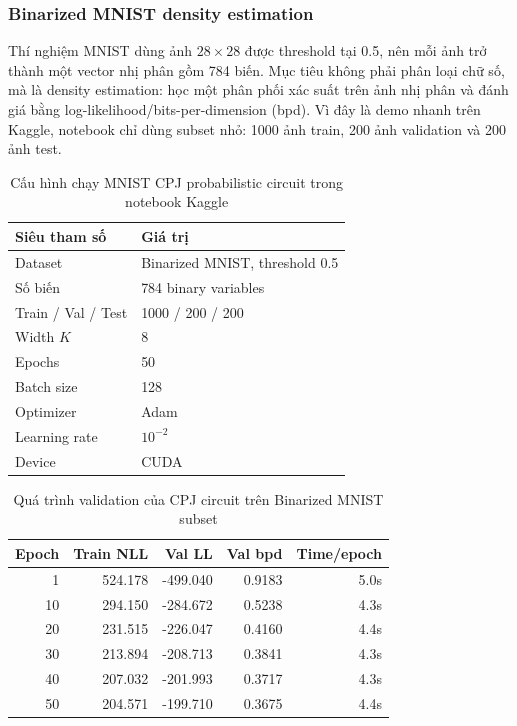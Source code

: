 \subsubsection{Binarized MNIST density estimation}

Thí nghiệm MNIST dùng ảnh $28\times 28$ được threshold tại 0.5, nên mỗi ảnh trở
thành một vector nhị phân gồm 784 biến. Mục tiêu không phải phân loại chữ số, mà
là density estimation: học một phân phối xác suất trên ảnh nhị phân và đánh giá
bằng log-likelihood/bits-per-dimension (bpd). Vì đây là demo nhanh trên Kaggle,
notebook chỉ dùng subset nhỏ: 1000 ảnh train, 200 ảnh validation và 200 ảnh test.

\begin{table}[H]
\centering
\caption{Cấu hình chạy MNIST CPJ probabilistic circuit trong notebook Kaggle}
\label{tab:pc-mnist-config}
\renewcommand{\arraystretch}{1.2}
\begin{tabular}{ll}
\toprule
\textbf{Siêu tham số} & \textbf{Giá trị} \\
\midrule
Dataset & Binarized MNIST, threshold 0.5 \\
Số biến & 784 binary variables \\
Train / Val / Test & 1000 / 200 / 200 \\
Width $K$ & 8 \\
Epochs & 50 \\
Batch size & 128 \\
Optimizer & Adam \\
Learning rate & $10^{-2}$ \\
Device & CUDA \\
\bottomrule
\end{tabular}
\end{table}

\begin{table}[H]
\centering
\caption{Quá trình validation của CPJ circuit trên Binarized MNIST subset}
\label{tab:pc-mnist-val}
\renewcommand{\arraystretch}{1.2}
\begin{tabular}{rrrrr}
\toprule
\textbf{Epoch} & \textbf{Train NLL} & \textbf{Val LL} & \textbf{Val bpd} & \textbf{Time/epoch} \\
\midrule
1  & 524.178 & -499.040 & 0.9183 & 5.0s \\
10 & 294.150 & -284.672 & 0.5238 & 4.3s \\
20 & 231.515 & -226.047 & 0.4160 & 4.4s \\
30 & 213.894 & -208.713 & 0.3841 & 4.3s \\
40 & 207.032 & -201.993 & 0.3717 & 4.3s \\
50 & 204.571 & -199.710 & 0.3675 & 4.4s \\
\bottomrule
\end{tabular}
\end{table}

